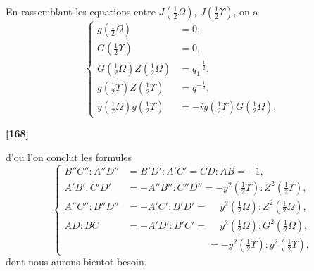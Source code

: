 \documentclass[11pt,a4paper]{book}
\begin{document}
En rassemblant les equations entre $J\left(\frac{1}{2}\Omega\right)$, $J\left(\frac{1}{2}\Upsilon\right)$, on a
\begin{equation}
\left\{
\begin{aligned}
g\left(\tfrac{1}{2}\Omega\right) &= 0,\\
G\left(\tfrac{1}{2}\Upsilon\right) &= 0,\\
G\left(\tfrac{1}{2}\Omega\right) Z\left(\tfrac{1}{2}\Omega\right) &= q_1^{-\frac{1}{2}},\\
g\left(\tfrac{1}{2}\Upsilon\right) Z\left(\tfrac{1}{2}\Upsilon\right) &= q^{-\frac{1}{2}},\\
y\left(\tfrac{1}{2}\Omega\right) g\left(\tfrac{1}{2}\Upsilon\right) &= -iy\left(\tfrac{1}{2}\Upsilon\right) G\left(\tfrac{1}{2}\Omega\right),
\end{aligned}
\right. \tag{31}
\end{equation}

\textbf{[168]}

d'ou l'on conclut les formules
\begin{equation}
\left\{
\begin{aligned}
B''C'' : A''D'' &= B'D' : A'C' = CD : AB = -1,\\
A'B' : C'D' &= -A''B'' : C''D'' = -y^2\left(\tfrac{1}{2}\Upsilon\right) : Z^2\left(\tfrac{1}{2}\Upsilon\right),\\
A''C'' : B''D'' &= -A'C' : B'D' = \phantom{-}y^2\left(\tfrac{1}{2}\Omega\right) : Z^2\left(\tfrac{1}{2}\Omega\right),\\
AD : BC &= -A'D' : B'C' = \phantom{-}y^2\left(\tfrac{1}{2}\Omega\right) : G^2\left(\tfrac{1}{2}\Omega\right),\\
&\phantom{= -A'D' : B'C' = } = -y^2\left(\tfrac{1}{2}\Upsilon\right) : g^2\left(\tfrac{1}{2}\Upsilon\right),
\end{aligned}
\right. \tag{32}
\end{equation}
dont nous aurons bientot besoin.
\end{document}
